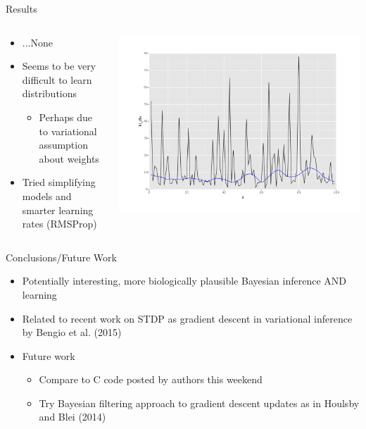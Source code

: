 \documentclass{beamer}
\begin{document}
\begin{frame}{Results}
\begin{columns}[T]
    \begin{column}{.5\textwidth}
  \begin{itemize}
  \item
  	...None
  \item
  	Seems to be very difficult to learn distributions
  	\begin{itemize}
	 \item
  		Perhaps due to variational assumption about weights
	 \end{itemize}
  \item
  	Tried simplifying models and smarter learning rates (RMSProp)
  \end{itemize}
  \end{column}
  \begin{column}{.5\textwidth}
   	\includegraphics[width = 1\textwidth]{kl.pdf}
    \end{column}
  \end{columns}
\end{frame}

\begin{frame}{Conclusions/Future Work}
  \begin{itemize}
  \item
  	Potentially interesting, more biologically plausible Bayesian inference AND learning
  \item
  	Related to recent work on STDP as gradient descent in variational inference by Bengio et al. (2015)
  \item
  	Future work
  	\begin{itemize}
  	\item
  		Compare to C code posted by authors this weekend
	\item
		Try Bayesian filtering approach to gradient descent updates as in Houlsby and Blei (2014)
	 \end{itemize}	
  \end{itemize}
\end{frame}
\end{document}
